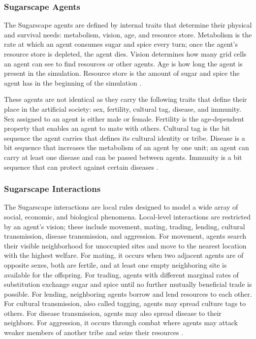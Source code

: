 \documentclass{icsthesis}
\begin{document}
\begin{mainmatter}
\subsubsection{Sugarscape Agents}	
The Sugarscape agents are defined by internal traits that determine their physical and survival needs: metabolism, vision, age, and resource store. Metabolism is the rate at which an agent consumes sugar and spice every turn; once the agent's resource store is depleted, the agent dies. Vision determines how many grid cells an agent can see to find resources or other agents. Age is how long the agent is present in the simulation. Resource store is the amount of sugar and spice the agent has in the beginning of the simulation  \citep{Kehoe2015}.

These agents are not identical as they carry the following traits that define their place in the artificial society: sex, fertility, cultural tag, disease, and immunity. Sex assigned to an agent is either male or female. Fertility is the age-dependent property that enables an agent to mate with others. Cultural tag is the bit sequence the agent carries that defines its cultural identity or tribe. Disease is a bit sequence that increases the metabolism of an agent by one unit; an agent can carry at least one disease and can be passed between agents. Immunity is a bit sequence that can protect against certain diseases \citep{Kehoe2015}.

\subsubsection{Sugarscape Interactions}	
The Sugarscape interactions are local rules designed to model a wide array of social, economic, and biological phenomena. Local-level interactions are restricted by an agent's vision; these include movement, mating, trading, lending, cultural transmission, disease transmission, and aggression. For movement, agents search their visible neighborhood for unoccupied sites and move to the nearest location with the highest welfare. For mating, it occurs when two adjacent agents are of opposite sexes, both are fertile, and at least one empty neighboring site is available for the offspring. For trading, agents with different marginal rates of substitution exchange sugar and spice until no further mutually beneficial trade is possible. For lending, neighboring agents borrow and lend resources to each other. For cultural transmission, also called tagging, agents may spread culture tags to others. For disease transmission, agents may also spread disease to their neighbors. For aggression, it occurs through combat where agents may attack weaker members of another tribe and seize their resources \citep{Kehoe2015}.


\end{mainmatter}
\end{document}
